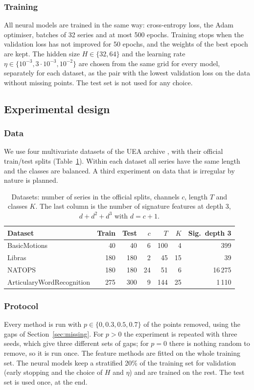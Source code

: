\subsubsection*{Training}
All neural models are trained in the same way: cross-entropy loss, the
Adam optimiser, batches of 32 series and at most 500 epochs. Training
stops when the validation loss has not improved for 50 epochs, and the
weights of the best epoch are kept. The hidden size $H \in \{32, 64\}$ and
the learning rate $\eta \in \{10^{-3}, 3 \cdot 10^{-3}, 10^{-2}\}$ are
chosen from the same grid for every model, separately for each dataset,
as the pair with the lowest validation loss on the data without missing
points. The test set is not used for any choice.

\subsection{Experimental design}\label{sec:design}

\subsubsection*{Data}
We use four multivariate datasets of the UEA archive
\cite{bagnall2018uea}, with their official
train/test splits (Table~\ref{tab:datasets}). Within each dataset all
series have the same length and the classes are balanced. A third
experiment on data that is irregular by nature is planned.

\begin{table}[ht]
\centering
\caption{Datasets: number of series in the official splits, channels $c$,
length $T$ and classes $K$. The last column is the number of signature
features at depth 3, $d + d^2 + d^3$ with $d = c + 1$.}
\label{tab:datasets}
\begin{tabular}{lrrrrrr}
\toprule
Dataset & Train & Test & $c$ & $T$ & $K$ & Sig.\ depth 3 \\
\midrule
BasicMotions & 40 & 40 & 6 & 100 & 4 & 399 \\
Libras & 180 & 180 & 2 & 45 & 15 & 39 \\
NATOPS & 180 & 180 & 24 & 51 & 6 & 16\,275 \\
ArticularyWordRecognition & 275 & 300 & 9 & 144 & 25 & 1\,110 \\
\bottomrule
\end{tabular}
\end{table}

\subsubsection*{Protocol}
Every method is run with $p \in \{0, 0.3, 0.5, 0.7\}$ of the points
removed, using the gaps of Section~\ref{sec:missing}. For $p > 0$ the
experiment is repeated with three seeds, which give three different sets
of gaps; for $p = 0$ there is nothing random to remove, so it is run once.
The feature methods are fitted on the whole training set. The neural
models keep a stratified 20\% of the training set for validation (early
stopping and the choice of $H$ and $\eta$) and are trained on the rest.
The test set is used once, at the end.


